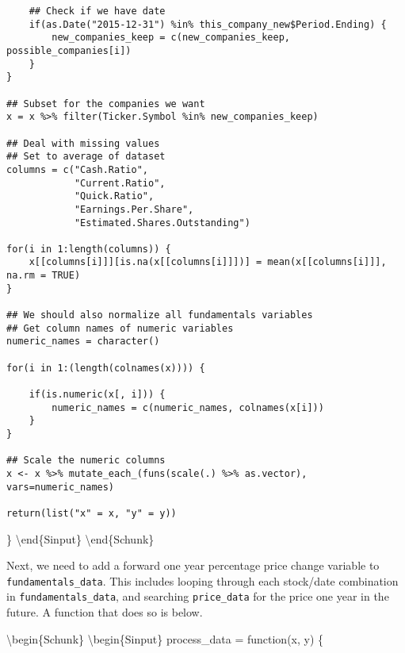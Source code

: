 \begin{verbatim}
    ## Check if we have date 
    if(as.Date("2015-12-31") %in% this_company_new$Period.Ending) {
        new_companies_keep = c(new_companies_keep, possible_companies[i])
    }
}

## Subset for the companies we want 
x = x %>% filter(Ticker.Symbol %in% new_companies_keep)

## Deal with missing values 
## Set to average of dataset 
columns = c("Cash.Ratio",
            "Current.Ratio",
            "Quick.Ratio",
            "Earnings.Per.Share",
            "Estimated.Shares.Outstanding")

for(i in 1:length(columns)) {
    x[[columns[i]]][is.na(x[[columns[i]]])] = mean(x[[columns[i]]], na.rm = TRUE)
}

## We should also normalize all fundamentals variables 
## Get column names of numeric variables 
numeric_names = character()

for(i in 1:(length(colnames(x)))) {
    
    if(is.numeric(x[, i])) {
        numeric_names = c(numeric_names, colnames(x[i]))
    }
}

## Scale the numeric columns
x <- x %>% mutate_each_(funs(scale(.) %>% as.vector), vars=numeric_names)

return(list("x" = x, "y" = y))
\end{verbatim}

\} \textbackslash{}end\{Sinput\} \textbackslash{}end\{Schunk\}

Next, we need to add a forward one year percentage price change variable
to \texttt{fundamentals\_data}. This includes looping through each
stock/date combination in \texttt{fundamentals\_data}, and searching
\texttt{price\_data} for the price one year in the future. A function
that does so is below.

\textbackslash{}begin\{Schunk\} \textbackslash{}begin\{Sinput\}
process\_data = function(x, y) \{

